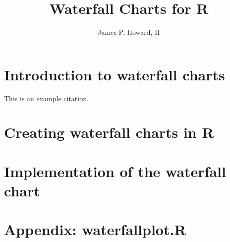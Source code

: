 \documentclass[article]{article}
\author{James P. Howard, II}
\title{Waterfall Charts for R}
\begin{document}
\maketitle
\section[Introduction to waterfall charts]{Introduction to waterfall charts}
This is an example citation\cite[115--118]{Rasiel1999}. 

\section[Creating waterfall charts in R]{Creating waterfall charts in R}

\section[Implementation of the waterfall chart]{Implementation of the waterfall chart}



\section[Appendix: waterfallplot.R]{Appendix: waterfallplot.R}
\end{document}
